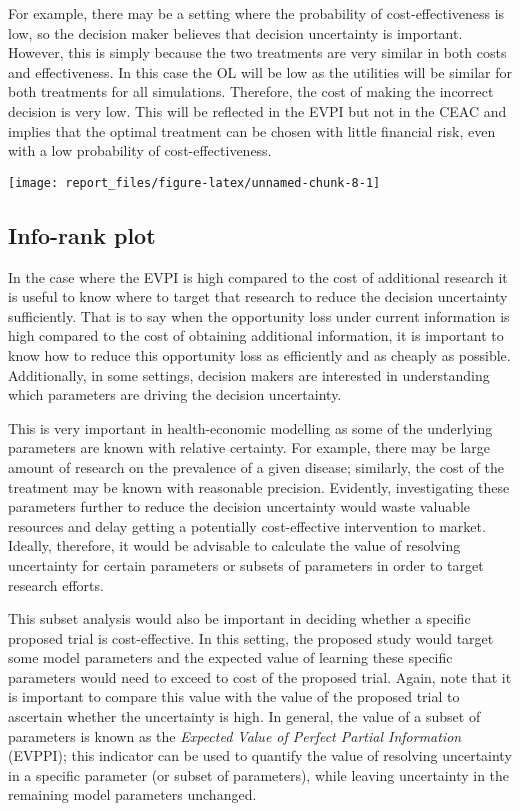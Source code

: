 \documentclass[]{article}
\begin{document}
For example, there may be a setting where the probability of
cost-effectiveness is low, so the decision maker believes that decision
uncertainty is important. However, this is simply because the two
treatments are very similar in both costs and effectiveness. In this
case the OL will be low as the utilities will be similar for both
treatments for all simulations. Therefore, the cost of making the
incorrect decision is very low. This will be reflected in the EVPI but
not in the CEAC and implies that the optimal treatment can be chosen
with little financial risk, even with a low probability of
cost-effectiveness.

\begin{center}\texttt{[image: report\_files/figure-latex/unnamed-chunk-8-1]} \end{center}

\subsection{Info-rank plot}\label{info-rank-plot}

In the case where the EVPI is high compared to the cost of additional
research it is useful to know where to target that research to reduce
the decision uncertainty sufficiently. That is to say when the
opportunity loss under current information is high compared to the cost
of obtaining additional information, it is important to know how to
reduce this opportunity loss as efficiently and as cheaply as possible.
Additionally, in some settings, decision makers are interested in
understanding which parameters are driving the decision uncertainty.

This is very important in health-economic modelling as some of the
underlying parameters are known with relative certainty. For example,
there may be large amount of research on the prevalence of a given
disease; similarly, the cost of the treatment may be known with
reasonable precision. Evidently, investigating these parameters further
to reduce the decision uncertainty would waste valuable resources and
delay getting a potentially cost-effective intervention to market.
Ideally, therefore, it would be advisable to calculate the value of
resolving uncertainty for certain parameters or subsets of parameters in
order to target research efforts.

This subset analysis would also be important in deciding whether a
specific proposed trial is cost-effective. In this setting, the proposed
study would target some model parameters and the expected value of
learning these specific parameters would need to exceed to cost of the
proposed trial. Again, note that it is important to compare this value
with the value of the proposed trial to ascertain whether the
uncertainty is high. In general, the value of a subset of parameters is
known as the \emph{Expected Value of Perfect Partial Information}
(EVPPI); this indicator can be used to quantify the value of resolving
uncertainty in a specific parameter (or subset of parameters), while
leaving uncertainty in the remaining model parameters unchanged.
\end{document}
